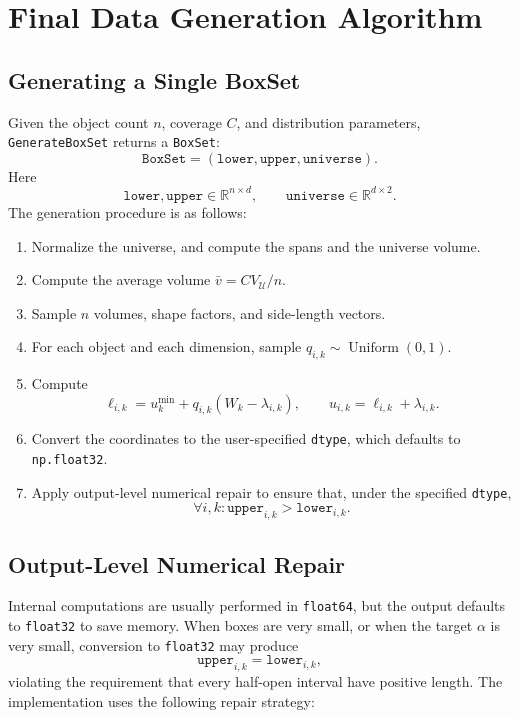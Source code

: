 \documentclass[11pt,a4paper]{article}
\newcommand{\Uset}{\mathcal{U}}
\newcommand{\Uniform}{\operatorname{Uniform}}
\newcommand{\dtype}{\texttt{dtype}}
\newcommand{\code}[1]{\texttt{#1}}
\begin{document}
\section{Final Data Generation Algorithm}

\subsection{Generating a Single BoxSet}

Given the object count $n$, coverage $C$, and distribution parameters, \code{GenerateBoxSet} returns a \code{BoxSet}:
\[
  \code{BoxSet}=(\code{lower},\code{upper},\code{universe}).
\]
Here
\[
  \code{lower},\code{upper}\in\mathbb{R}^{n\times d},
  \qquad
  \code{universe}\in\mathbb{R}^{d\times2}.
\]
The generation procedure is as follows:
\begin{enumerate}
  \item Normalize the universe, and compute the spans and the universe volume.
  \item Compute the average volume $\bar v=C V_{\Uset}/n$.
  \item Sample $n$ volumes, shape factors, and side-length vectors.
  \item For each object and each dimension, sample $q_{i,k}\sim\Uniform(0,1)$.
  \item Compute
  \[
    \ell_{i,k}=u_k^{\min}+q_{i,k}(W_k-\lambda_{i,k}),
    \qquad
    u_{i,k}=\ell_{i,k}+\lambda_{i,k}.
  \]
  \item Convert the coordinates to the user-specified \dtype, which defaults to \code{np.float32}.
  \item Apply output-level numerical repair to ensure that, under the specified \dtype,
  \[
    \forall i,k:
    \code{upper}_{i,k}>\code{lower}_{i,k}.
  \]
\end{enumerate}

\subsection{Output-Level Numerical Repair}

Internal computations are usually performed in \code{float64}, but the output defaults to \code{float32} to save memory. When boxes are very small, or when the target $\alpha$ is very small, conversion to \code{float32} may produce
\[
  \code{upper}_{i,k}=\code{lower}_{i,k},
\]
violating the requirement that every half-open interval have positive length. The implementation uses the following repair strategy:
\end{document}
